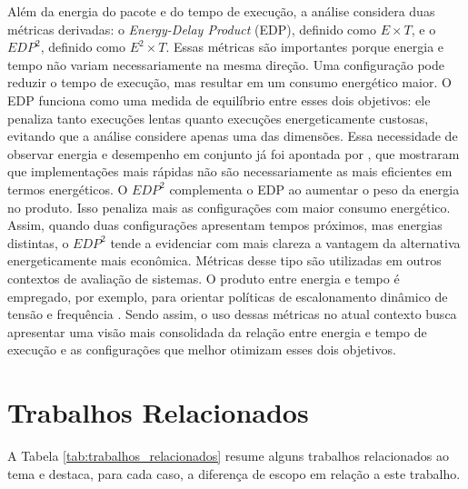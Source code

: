 Além da energia do pacote e do tempo de execução, a análise considera duas
métricas derivadas: o \textit{Energy-Delay Product} (EDP), definido como
\(E \times T\), e o \(EDP^2\), definido como \(E^2 \times T\). Essas métricas
são importantes porque energia e tempo não variam necessariamente na mesma
direção. Uma configuração pode reduzir o tempo de execução, mas resultar em um
consumo energético maior. O EDP funciona como uma medida de equilíbrio entre
esses dois objetivos: ele penaliza tanto execuções lentas quanto execuções
energeticamente custosas, evitando que a análise considere apenas uma das
dimensões. Essa necessidade de observar energia e desempenho em conjunto já foi
apontada por , que mostraram que
implementações mais rápidas não são necessariamente as mais eficientes em
termos energéticos. O \(EDP^2\) complementa o EDP ao aumentar o peso da
energia no produto. Isso penaliza mais as configurações com maior consumo
energético. Assim, quando duas configurações apresentam tempos próximos, mas
energias distintas, o \(EDP^2\) tende a evidenciar com mais clareza a vantagem
da alternativa energeticamente mais econômica. Métricas desse tipo são
utilizadas em outros contextos de avaliação de sistemas. O produto entre
energia e tempo é empregado, por exemplo, para orientar políticas de
escalonamento dinâmico de tensão e frequência \cite{green-governors}. Sendo
assim, o uso dessas métricas no atual contexto busca apresentar uma visão mais
consolidada da relação entre energia e tempo de execução e as configurações que
melhor otimizam esses dois objetivos.

\section{Trabalhos Relacionados}

A Tabela \ref{tab:trabalhos_relacionados} resume alguns trabalhos relacionados ao
tema e destaca, para cada caso, a diferença de escopo em relação a este trabalho.

